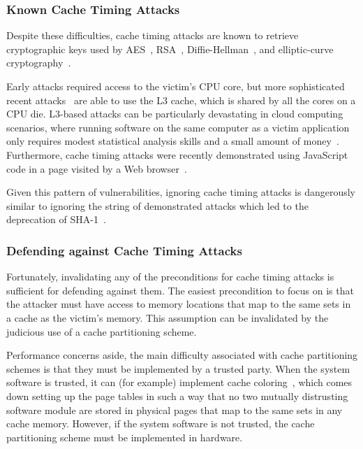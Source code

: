 \subsubsection{Known Cache Timing Attacks}

Despite these difficulties, cache timing attacks are known to retrieve
cryptographic keys used by AES~\cite{osvik2006aes, bonneau2006aes},
RSA~\cite{brumley2005rsa}, Diffie-Hellman~\cite{kocher1996timing}, and
elliptic-curve cryptography~\cite{brumley2011ecc}.

Early attacks required access to the victim's CPU core, but more sophisticated
recent attacks~\cite{yarom2013llctiming, liu2015llctiming} are able to use the
L3 cache, which is shared by all the cores on a CPU die. L3-based attacks can
be particularly devastating in cloud computing scenarios, where running
software on the same computer as a victim application only requires modest
statistical analysis skills and a small amount of
money~\cite{ristenpart2009colocation}. Furthermore, cache timing attacks were
recently demonstrated using JavaScript code in a page visited by a Web
browser~\cite{oren2015jstiming}.

Given this pattern of vulnerabilities, ignoring cache timing attacks is
dangerously similar to ignoring the string of demonstrated attacks which led to
the deprecation of SHA-1~\cite{nist2014sha1policy, google2014sha1deprecation,
microsoft2014sha1deprecation}.


\subsubsection{Defending against Cache Timing Attacks}
\label{sec:cache_timing_workarounds}

Fortunately, invalidating any of the preconditions for cache timing attacks is
sufficient for defending against them. The easiest precondition to focus on is
that the attacker must have access to memory locations that map to the same
sets in a cache as the victim's memory. This assumption can be invalidated by
the judicious use of a cache partitioning scheme.

Performance concerns aside, the main difficulty associated with cache
partitioning schemes is that they must be implemented by a trusted party. When
the system software is trusted, it can (for example) implement cache
coloring~\cite{taylor1990coloring}, which comes down setting up the page tables
in such a way that no two mutually distrusting software module are stored in
physical pages that map to the same sets in any cache memory. However, if the
system software is not trusted, the cache partitioning scheme must be
implemented in hardware.

